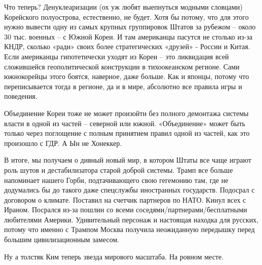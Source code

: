 Что теперь? Денуклеаризации (ох уж любят выепнуться модными словцами)
Корейского полуострова, естественно, не будет. Хотя бы потому, что для этого
нужно вывести одну из самых крупных группировок Штатов за рубежом – около 30
тыс. военных – с Южной Кореи. И там американцы пасутся не столько из-за КНДР,
сколько «ради» своих более стратегических «друзей» - России и Китая. Если
американцы гипотетически уходят из Кореи – это ликвидация всей сложившейся
геополитической конструкции в тихоокеанском регионе. Сами южнокорейцы этого
боятся, наверное, даже больше. Как и японцы, потому что переписывается тогда в
регионе, да и в мире, абсолютно все правила игры и поведения.

Объединение Кореи тоже не может произойти без полного демонтажа системы власти
в одной из частей – северной или южной. «Объединение» может быть только через
поглощение с полным принятием правил одной из частей, как это произошло с ГДР.
А Ын не Хонеккер.

В итоге, мы получаем о дивный новый мир, в котором Штаты все чаще играют роль
шутов и дестабилизатора старой доброй системы. Трамп все больше напоминает
нашего Горби, подтачивающего свою гегемонию там, где не додумались бы до такого
даже спецслужбы иностранных государств. Подосрал с договором о климате.
Поставил на счетчик партнеров по НАТО. Кинул всех с Ираном. Посрался из-за
пошлин со всеми соседями/партнерами/бесплатными любителями Америки.
Удивительный персонаж и настоящая находка для русских, потому что именно с
Трампом Москва получила неожиданную передышку перед большим цивилизационным
замесом.

Ну а толстяк Ким теперь звезда мирового масштаба. На ровном месте.

